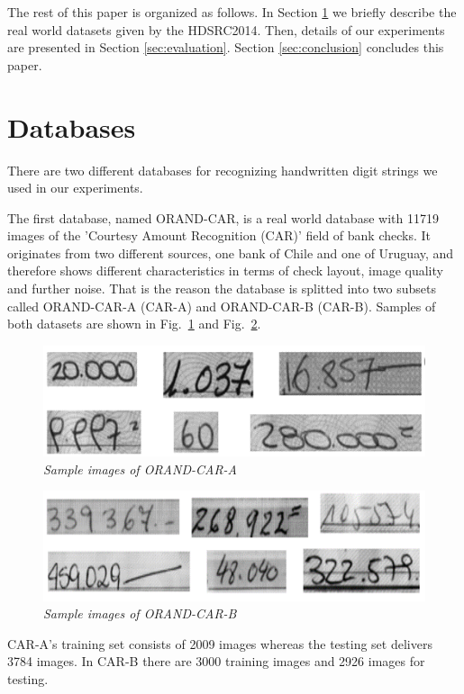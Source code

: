 The rest of this paper is organized as follows. In Section \ref{Datasets} we briefly describe the real world datasets given by the HDSRC2014. Then, details of our experiments are presented in Section \ref{sec:evaluation}. Section \ref{sec:conclusion} concludes this paper.

\section{Databases} \label{Datasets}
There are two different databases for recognizing handwritten digit strings we used in our experiments.

The first database, named ORAND-CAR, is a real world database with 11719 images of the 'Courtesy Amount Recognition (CAR)' field of bank checks. It originates from two different sources, one bank of Chile and one of Uruguay, and therefore shows different characteristics in terms of check layout, image quality and further noise. That is the reason the database is splitted into two subsets called ORAND-CAR-A (CAR-A) and ORAND-CAR-B (CAR-B). Samples of both datasets are shown in Fig.~\ref{fig:carA} and Fig.~\ref{fig:carB}.

\begin{figure}
  \includegraphics[width=\linewidth]{images/CAR-A-Splitted.png}
  \caption{\it Sample images of ORAND-CAR-A}
  \label{fig:carA}
\end{figure}

\begin{figure}
  \includegraphics[width=\linewidth]{images/CAR-B-Splitted.png}
  \caption{\it Sample images of ORAND-CAR-B}
  \label{fig:carB}
\end{figure}

CAR-A's training set consists of 2009 images whereas the testing set delivers 3784 images. In CAR-B there are 3000 training images and 2926 images for testing.

